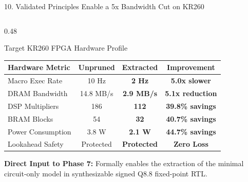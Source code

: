 \documentclass[aspectratio=169, 10pt]{beamer}
\begin{document}
\begin{frame}{10. Validated Principles Enable a 5x Bandwidth Cut on KR260}
\begin{columns}[T]
    \begin{column}{0.48\textwidth}
      \begin{block}{Target KR260 FPGA Hardware Profile}
        \scriptsize
        \centering
        \setlength{\tabcolsep}{3pt}
        \begin{tabular}{lccc}
          \toprule
          \textbf{Hardware Metric} & \textbf{Unpruned} & \textbf{Extracted} & \textbf{Improvement} \\
          \midrule
          Macro Exec Rate & 10 Hz & \textbf{2 Hz} & \textbf{5.0x slower} \\
          DRAM Bandwidth & 14.8 MB/s & \textbf{2.9 MB/s} & \textbf{5.1x reduction} \\
          DSP Multipliers & 186 & \textbf{112} & \textbf{39.8\% savings} \\
          BRAM Blocks & 54 & \textbf{32} & \textbf{40.7\% savings} \\
          Power Consumption & 3.8 W & \textbf{2.1 W} & \textbf{44.7\% savings} \\
          Lookahead Safety & Protected & \textbf{Protected} & \textbf{Zero Loss} \\
          \bottomrule
        \end{tabular}
      \end{block}
      \vspace{0.05cm}
      \scriptsize \textbf{Direct Input to Phase 7:} Formally enables the extraction of the minimal circuit-only model in synthesizable signed Q8.8 fixed-point RTL.
    \end{column}
  \end{columns}
\end{frame}
\end{document}
